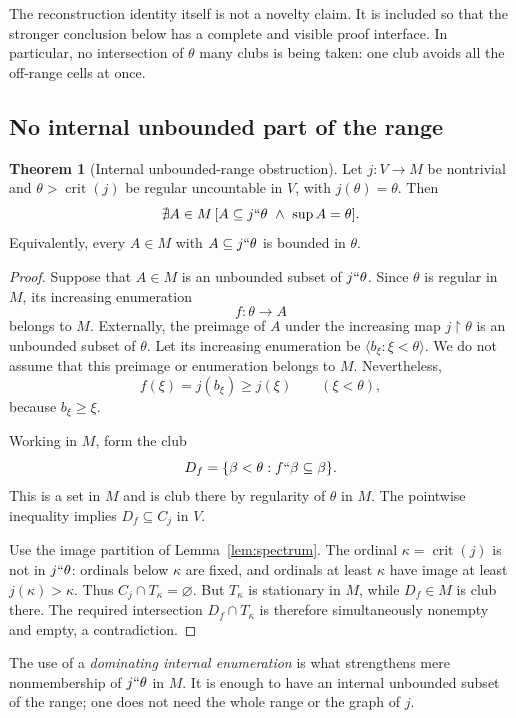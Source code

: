 \documentclass[11pt,letterpaper]{article}
\theoremstyle{definition}
\newtheorem{theorem}[definition]{Theorem}
\newcommand{\crit}{\operatorname{crit}}
\newcommand{\restr}{\mathbin{\upharpoonright}}
\theoremstyle{remark}
\begin{document}
The reconstruction identity itself is not a novelty claim. It is included so that the stronger conclusion below has a complete and visible proof interface. In particular, no intersection of $\theta$ many clubs is being taken: one club avoids all the off-range cells at once.

\subsection{No internal unbounded part of the range}

\begin{theorem}[Internal unbounded-range obstruction]\label{thm:range}
Let $j:V\to M$ be nontrivial and $\theta>\crit(j)$ be regular uncountable in $V$, with $j(\theta)=\theta$. Then
\begin{equation}
 \nexists A\in M\,
       [A\subseteq j``\theta\ \wedge\ \sup A=\theta].\label{eq:no-unbounded}
\end{equation}
Equivalently, every $A\in M$ with $A\subseteq j``\theta$ is bounded in $\theta$.
\end{theorem}

\begin{proof}
Suppose that $A\in M$ is an unbounded subset of $j``\theta$. Since $\theta$ is regular in $M$, its increasing enumeration
\[
 f:\theta\longrightarrow A
\]
belongs to $M$. Externally, the preimage of $A$ under the increasing map $j\restr\theta$ is an unbounded subset of $\theta$. Let its increasing enumeration be $\langle b_\xi:\xi<\theta\rangle$. We do not assume that this preimage or enumeration belongs to $M$. Nevertheless,
\[
 f(\xi)=j(b_\xi)\geq j(\xi)\qquad(\xi<\theta),
\]
because $b_\xi\geq\xi$.

Working in $M$, form the club
\[
 D_f=\{\beta<\theta:f``\beta\subseteq\beta\}.
\]
This is a set in $M$ and is club there by regularity of $\theta$ in $M$. The pointwise inequality implies $D_f\subseteq C_j$ in $V$.

Use the image partition of Lemma~\ref{lem:spectrum}. The ordinal $\kappa=\crit(j)$ is not in $j``\theta$: ordinals below $\kappa$ are fixed, and ordinals at least $\kappa$ have image at least $j(\kappa)>\kappa$. Thus $C_j\cap T_\kappa=\varnothing$. But $T_\kappa$ is stationary in $M$, while $D_f\in M$ is club there. The required intersection $D_f\cap T_\kappa$ is therefore simultaneously nonempty and empty, a contradiction.
\end{proof}

The use of a \emph{dominating internal enumeration} is what strengthens mere nonmembership of $j``\theta$ in $M$. It is enough to have an internal unbounded subset of the range; one does not need the whole range or the graph of $j$.
\end{document}
